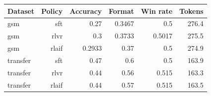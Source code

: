\begin{center}\small
\begin{tabular}{lrrrrr}
\toprule
Dataset & Policy & Accuracy & Format & Win rate & Tokens \\
\midrule
gsm & sft & 0.27 & 0.3467 & 0.5 & 276.4 \\
gsm & rlvr & 0.3 & 0.3733 & 0.5017 & 275.5 \\
gsm & rlaif & 0.2933 & 0.37 & 0.5 & 274.9 \\
transfer & sft & 0.47 & 0.6 & 0.5 & 163.9 \\
transfer & rlvr & 0.44 & 0.56 & 0.515 & 163.3 \\
transfer & rlaif & 0.44 & 0.57 & 0.515 & 163.5 \\
\bottomrule
\end{tabular}
\end{center}
